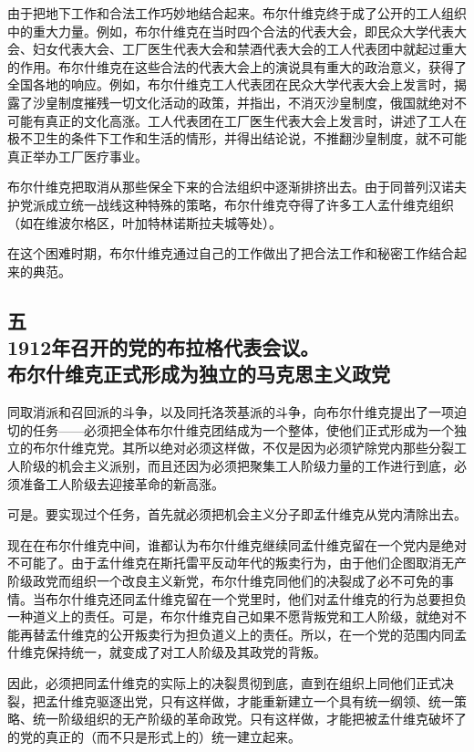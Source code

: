 由于把地下工作和合法工作巧妙地结合起来。布尔什维克终于成了公开的工人组织中的重大力量。例如，布尔什维克在当时四个合法的代表大会，即民众大学代表大会、妇女代表大会、工厂医生代表大会和禁酒代表大会的工人代表团中就起过重大的作用。布尔什维克在这些合法的代表大会上的演说具有重大的政治意义，获得了全国各地的响应。例如，布尔什维克工人代表团在民众大学代表大会上发言时，揭露了沙皇制度摧残一切文化活动的政策，并指出，不消灭沙皇制度，俄国就绝对不可能有真正的文化高涨。工人代表团在工厂医生代表大会上发言时，讲述了工人在极不卫生的条件下工作和生活的情形，并得出结论说，不推翻沙皇制度，就不可能真正举办工厂医疗事业。

布尔什维克把取消从那些保全下来的合法组织中逐渐排挤出去。由于同普列汉诺夫护党派成立统一战线这种特殊的策略，布尔什维克夺得了许多工人孟什维克组织（如在维波尔格区，叶加特林诺斯拉夫城等处）。

在这个困难时期，布尔什维克通过自己的工作做出了把合法工作和秘密工作结合起来的典范。


\subsection[五\q 1912年召开的党的布拉格代表会议。布尔什维克正式形成为独立的马克思主义政党]{五\\ 1912年召开的党的布拉格代表会议。\\ 布尔什维克正式形成为独立的马克思主义政党}

同取消派和召回派的斗争，以及同托洛茨基派的斗争，向布尔什维克提出了一项迫切的任务——必须把全体布尔什维克团结成为一个整体，使他们正式形成为一个独立的布尔什维克党。其所以绝对必须这样做，不仅是因为必须铲除党内那些分裂工人阶级的机会主义派别，而且还因为必须把聚集工人阶级力量的工作进行到底，必须准备工人阶级去迎接革命的新高涨。

可是。要实现过个任务，首先就必须把机会主义分子即孟什维克从党内清除出去。

现在在布尔什维克中间，谁都认为布尔什维克继续同孟什维克留在一个党内是绝对不可能了。由于孟什维克在斯托雷平反动年代的叛卖行为，由于他们企图取消无产阶级政党而组织一个改良主义新党，布尔什维克同他们的决裂成了必不可免的事情。当布尔什维克还同孟什维克留在一个党里时，他们对孟什维克的行为总要担负一种道义上的责任。可是，布尔什维克自己如果不愿背叛党和工人阶级，就绝对不能再替孟什维克的公开叛卖行为担负道义上的责任。所以，在一个党的范围内同孟什维克保持统一，就变成了对工人阶级及其政党的背叛。

因此，必须把同孟什维克的实际上的决裂贯彻到底，直到在组织上同他们正式决裂，把孟什维克驱逐出党，只有这样做，才能重新建立一个具有统一纲领、统一策略、统一阶级组织的无产阶级的革命政党。只有这样做，才能把被孟什维克破坏了的党的真正的（而不只是形式上的）统一建立起来。

